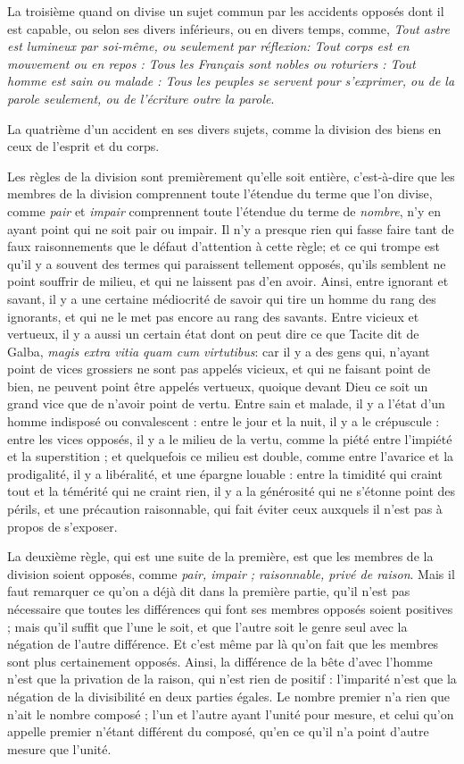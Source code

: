 La troisième quand on divise un sujet commun par les accidents opposés dont il est capable, ou selon ses divers inférieurs, ou en divers temps, comme, \emph{Tout astre est lumineux par soi-même, ou seulement par réflexion: Tout corps est en mouvement ou en repos : Tous les Français sont nobles ou roturiers : Tout homme est sain ou malade : Tous les peuples se servent pour s'exprimer, ou de la parole seulement, ou de l'écriture outre la parole}.

La quatrième d'un accident en ses divers sujets, comme la division des biens en ceux de l'esprit et du corps.

Les règles de la division sont premièrement qu'elle soit entière, c'est-à-dire que les membres de la division comprennent toute l'étendue du terme que l'on divise, comme \emph{pair} et \emph{impair} comprennent toute l'étendue du terme de \emph{nombre}, n'y en ayant point qui ne soit pair ou impair. Il n'y a presque rien qui fasse faire tant de faux raisonnements que le défaut d'attention à cette règle; et ce qui trompe est qu'il y a souvent des termes qui paraissent tellement opposés, qu'ils semblent ne point souffrir de milieu, et qui ne laissent pas d'en avoir. Ainsi, entre ignorant et savant, il y a une certaine médiocrité de savoir qui tire un homme du rang des ignorants, et qui ne le met pas encore au rang des savants. Entre vicieux et vertueux, il y a aussi un certain état dont on peut dire ce que Tacite dit de Galba, \emph{magis extra vitia quam cum virtutibus}: car il y a des gens qui, n'ayant point de vices grossiers ne sont pas appelés vicieux, et qui ne faisant point de bien, ne peuvent point être appelés vertueux, quoique devant Dieu ce soit un grand vice que de n'avoir point de vertu. Entre sain et malade, il y a l'état d'un homme indisposé ou convalescent : entre le jour et la nuit, il y a le crépuscule : entre les vices opposés, il y a le milieu de la vertu, comme la piété entre l'impiété et la superstition ; et quelquefois ce milieu est double, comme entre l'avarice et la prodigalité, il y a libéralité, et une épargne louable : entre la timidité qui craint tout et la témérité qui ne craint rien, il y a la générosité qui ne s'étonne point des périls, et une précaution raisonnable, qui fait éviter ceux auxquels il n'est pas à propos de s'exposer.

La deuxième règle, qui est une suite de la première, est que les membres de la division soient opposés, comme \emph{pair, impair ; raisonnable, privé de raison}. Mais il faut remarquer ce qu'on a déjà dit dans la première partie, qu'il n'est pas nécessaire que toutes les différences qui font ses membres opposés soient positives ; mais qu'il suffit que l'une le soit, et que l'autre soit le genre seul avec la négation de l'autre différence. Et c'est même par là qu'on fait que les membres sont plus certainement opposés. Ainsi, la différence de la bête d'avec l'homme n'est que la privation de la raison, qui n'est rien de positif : l'imparité n'est que la négation de la divisibilité en deux parties égales. Le nombre premier n'a rien que n'ait le nombre composé ; l'un et l'autre ayant l'unité pour mesure, et celui qu'on appelle premier n'étant différent du composé, qu'en ce qu'il n'a point d'autre mesure que l'unité.

